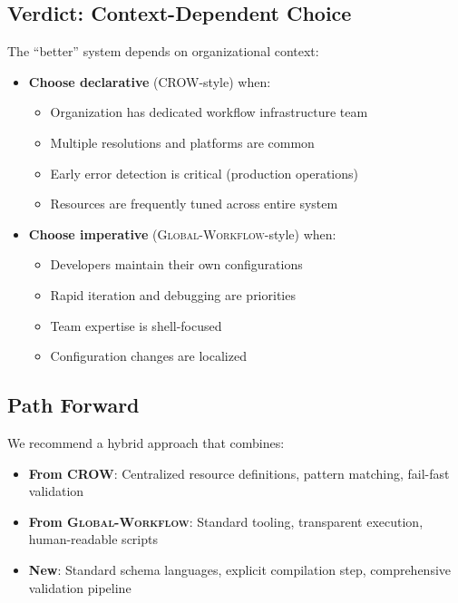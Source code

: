 \documentclass[11pt,twoside]{article}
\newcommand{\crow}{\textsc{CROW}}
\newcommand{\gw}{\textsc{Global-Workflow}}
\begin{document}
\subsection{Verdict: Context-Dependent Choice}

The ``better'' system depends on organizational context:

\begin{itemize}[leftmargin=2em]
    \item \textbf{Choose declarative} (\crow{}-style) when:
    \begin{itemize}
        \item Organization has dedicated workflow infrastructure team
        \item Multiple resolutions and platforms are common
        \item Early error detection is critical (production operations)
        \item Resources are frequently tuned across entire system
    \end{itemize}
    
    \item \textbf{Choose imperative} (\gw{}-style) when:
    \begin{itemize}
        \item Developers maintain their own configurations
        \item Rapid iteration and debugging are priorities
        \item Team expertise is shell-focused
        \item Configuration changes are localized
    \end{itemize}
\end{itemize}

\subsection{Path Forward}

We recommend a hybrid approach that combines:
\begin{itemize}[leftmargin=2em]
    \item \textbf{From \crow{}}: Centralized resource definitions, pattern matching, fail-fast validation
    \item \textbf{From \gw{}}: Standard tooling, transparent execution, human-readable scripts
    \item \textbf{New}: Standard schema languages, explicit compilation step, comprehensive validation pipeline
\end{itemize}
\end{document}
